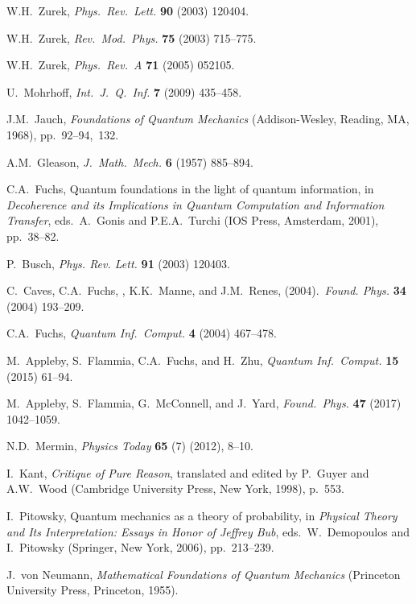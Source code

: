 \documentclass[12pt]{article}
\begin{document}
\begin{thebibliography}{99}
 W.H.\ Zurek, \textit{Phys.\ Rev.\ Lett.} \textbf{90} (2003) 120404.

 W.H.\ Zurek,  \textit{Rev.\ Mod.\ Phys.} \textbf{75} (2003) 715--775.

 W.H.\ Zurek, \textit{Phys.\ Rev.\ A} \textbf{71} (2005) 052105.

 U.\ Mohrhoff, \emph{Int.\ J.\ Q.\ Inf.} \textbf{7} (2009) 435--458.

 J.M.\ Jauch, \emph{Foundations of Quantum Mechanics} (Addison-Wesley, Reading, MA, 1968), pp.\ 92--94,~132.

 A.M.\ Gleason, \emph{J.\ Math.\ Mech.} \textbf{6} (1957) 885--894.

 C.A.\ Fuchs, Quantum foundations in the light of quantum information, in \textit{Decoherence and its Implications in Quantum Computation and Information Transfer}, eds.\ A.\ Gonis and P.E.A.\ Turchi (IOS Press, Amsterdam, 2001), pp.\ 38--82.

 P.\ Busch, \emph{Phys. Rev. Lett.} \textbf{91} (2003) 120403.

 C.\ Caves,  C.A.\ Fuchs, , K.K.\ Manne,  and J.M.\ Renes, (2004).\ \emph{Found. Phys.} \textbf{34} (2004) 193--209.

 C.A.\ Fuchs, \textit{Quantum Inf.\ Comput.} \textbf{4} (2004) 467--478.

 M.\ Appleby, S.\ Flammia,  C.A.\ Fuchs, and H.\ Zhu, \textit{Quantum Inf.\ Comput.} \textbf{15} (2015) 61--94.

 M.\ Appleby, S.\ Flammia, G.\ McConnell, and J.\ Yard, \textit{Found.\ Phys.} \textbf{47} (2017) 1042--1059.

 N.D.\ Mermin, \textit{Physics Today} \textbf{65} (7) (2012), 8--10.

 I.\ Kant, \emph{Critique of Pure Reason}, translated and edited by P.\ Guyer and A.W.\ Wood (Cambridge University Press, New York, 1998), p.~553.

  I.\ Pitowsky, Quantum mechanics as a theory of probability, in \textit{Physical Theory and Its Interpretation: Essays in Honor of Jeffrey Bub}, eds.\ W.\ Demopoulos and I.\ Pitowsky (Springer, New York, 2006), pp.\ 213--239.

 J.\ von Neumann, \emph{Mathematical Foundations of Quantum Mechanics} (Princeton University Press,  Princeton, 1955).


\end{thebibliography}
\end{document}
